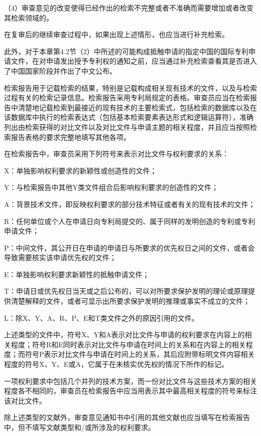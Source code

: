 {\setlength{\parindent}{17.1bp}（4）审查意见的改变使得已经作出的检索不完整或者不准确而需要增加或者改变其检索领域的。\par}

在复审后的继续审查过程中，如果出现上述情形，也应当进行补充检索。

此外，对于本章第4.2节（2）中所述的可能构成抵触申请的指定中国的国际专利申请文件，在对申请发出授予专利权的通知之前，应当通过补充检索查看其是否进入了中国国家阶段并作出了中文公布。

检索报告用于记载检索的结果，特别是记载构成相关现有技术的文件，以及与检索过程有关的检索记录信息。检索报告采用专利局规定的表格。审查员应当在检索报告中清楚地记载检索到最接近的现有技术的主要检索式，包括检索的数据库以及在该数据库中执行的检索表达式（包括基本检索要素表达形式和逻辑运算符），准确列出由检索获得的对比文件以及对比文件与申请主题的相关程度，并且应当按照检索报告表格的要求完整地填写其他各项。

在检索报告中，审查员采用下列符号来表示对比文件与权利要求的关系：

X：单独影响权利要求的新颖性或创造性的文件；

Y：与检索报告中其他Y类文件组合后影响权利要求的创造性的文件；

A：背景技术文件，即反映权利要求的部分技术特征或者有关的现有技术的文件；

R：任何单位或个人在申请日向专利局提交的、属于同样的发明创造的专利或专利申请文件；

P：中间文件，其公开日在申请的申请日与所要求的优先权日之间的文件，或者会导致需要核实该申请优先权的文件；

E：单独影响权利要求新颖性的抵触申请文件；

T：申请日或优先权日当天或之后公布的，可以对所要求保护发明的理论或原理提供清楚解释的文件，或者可显示出所要求保护发明的推理或事实不成立的文件；

L：除X、Y、A、R、P、E和T类文件之外的原因引用的文件。

上述类型的文件中，符号X、Y和A表示对比文件与申请的权利要求在内容上的相关程度；符号R和E同时表示对比文件与申请在时间上的关系和在内容上的相关程度；而符号P表示对比文件与申请在时间上的关系，其后应附带标明文件内容相关程度的符号X、Y、E或A，它属于在未核实优先权的情况下所作的标记。

一项权利要求中包括几个并列的技术方案，而一份对比文件与这些技术方案的相关程度各不相同的，审查员在检索报告中应当用表示其中最高相关程度的符号来标注该对比文件。

除上述类型的文献外，审查意见通知书中引用的其他文献也应当填写在检索报告中，但不填写文献类型和/或所涉及的权利要求。

